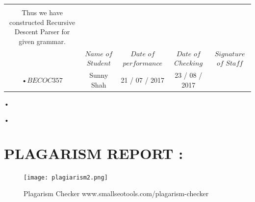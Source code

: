 \documentclass[11pt]{article}
\begin{document}
\begin{center}
\begin{tabular}{|c|c|c|c|c|}
\begin{document}
			\noindent
			CONCLUSION:\\
			Thus we have constructed Recursive Descent Parser for given grammar.\\
			
			\begin{center}
			\begin{tabular}{|c|c|c|c|c|}
			•$Roll$ $No$ & $Name$ $of$ $Student$ & $Date$ $of$ $performance$ & $Date$ $of$ $Checking$ & $Signature$ $of$ $Staff$ \\ \hline
			•$BECOC357$ & Sunny Shah& 21 / 07 / 2017& 23 / 08 / 2017 &  \\ \hline
			\end{tabular}•
			\end{center}•
			
			\newpage
			\section{PLAGARISM REPORT :}
			\begin{figure}[h!]
			\centering
			\texttt{[image: plagiarism2.png]}
			\caption{Plagarism Checker www.smallseotools.com/plagarism-checker}
			\end{figure}
			\newpage
			
\end{document}
